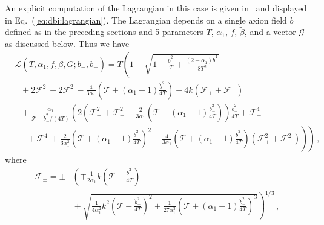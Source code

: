 \documentclass[11pt]{article}
\begin{document}
An explicit computation of the Lagrangian in this case is given in~\cite{Nath:2018xxe} and displayed in Eq.~(\ref{eq:dbi:lagrangian}).
The Lagrangian depends on a single axion field $b_-$ defined as in the preceding sections and 5 parameters $T$, $\alpha_1$, $f$, $\tilde\beta$, and a vector $\mathcal{G}$ as discussed below.
Thus we have
\begin{equation} \label{eq:dbi:lagrangian}
  \begin{aligned}
    &\mathcal{L}\left(T, \alpha_1, f, \beta, G; b_-, \dot{b_-}\right) = T \left(
        1
      - \sqrt{
          1
        - \frac{{\dot b}_-^2}{T}
        + \frac{\left(2 - \alpha_1\right) {\dot b}_-^4}{8 T^2}
      }\right.\\
      &~~~ \left.{}
      + 2 \mathcal{F}_+^2
      + 2 \mathcal{F}_-^2
      - \frac{4}{3 \alpha_1} \left(
        \mathcal{T} + \left(\alpha_1 - 1\right) \frac{{\dot b}_-^2}{4 T}
      \right)
      + 4 k \left(\mathcal{F}_+ + \mathcal{F}_-\right)\right.\\
      &~~~ \left.{}
      + \frac{\alpha_1}{\mathcal{T} - {\dot b}_-^2 / \left(4 T\right)}\left(
          2 \left(
              \mathcal{F}_+^2
            + \mathcal{F}_-^2
            - \frac{2}{3 \alpha_1}
              \left(\mathcal{T} + \left(\alpha_1 - 1\right) \frac{{\dot b}_-^2}{4 T}\right)
          \right) \frac{{\dot b}_-^2}{4 T}
        + \mathcal{F}_+^4\right.\right.\\
        &~~~~~~ \left.\left.{}
        + \mathcal{F}_-^4
        + \frac{2}{3 \alpha_1^2}
          \left(\mathcal{T} + \left(\alpha_1 - 1\right) \frac{{\dot b}_-^2}{4 T}\right)^2
        - \frac{4}{3 \alpha_1}
          \left(\mathcal{T} + \left(\alpha_1 - 1\right) \frac{{\dot b}_-^2}{4 T}\right)
          \left(\mathcal{F}_+^2 + \mathcal{F}_-^2\right)
      \right)
    \right)\,,
  \end{aligned}
\end{equation}
where
\begin{equation}
  \begin{aligned}
    \mathcal{F}_\pm = \pm &\left(
      \mp\frac{1}{2 \alpha_1} k \left(\mathcal{T} - \frac{{\dot b}_-^2}{4 T}\right)\right.\\
      &\left.{} + \sqrt{
          \frac{1}{4 \alpha_1^2} k^2 \left(\mathcal{T} - \frac{{\dot b}_-^2}{4 T}\right)^2
        + \frac{1}{27 \alpha_1^3} \left(
            \mathcal{T}
          + \left(\alpha_1 - 1\right) \frac{{\dot b}_-^2}{4 T}
        \right)^3
      }
    \right)^{1 / 3}\,,
  \end{aligned}
\end{equation}
\end{document}
